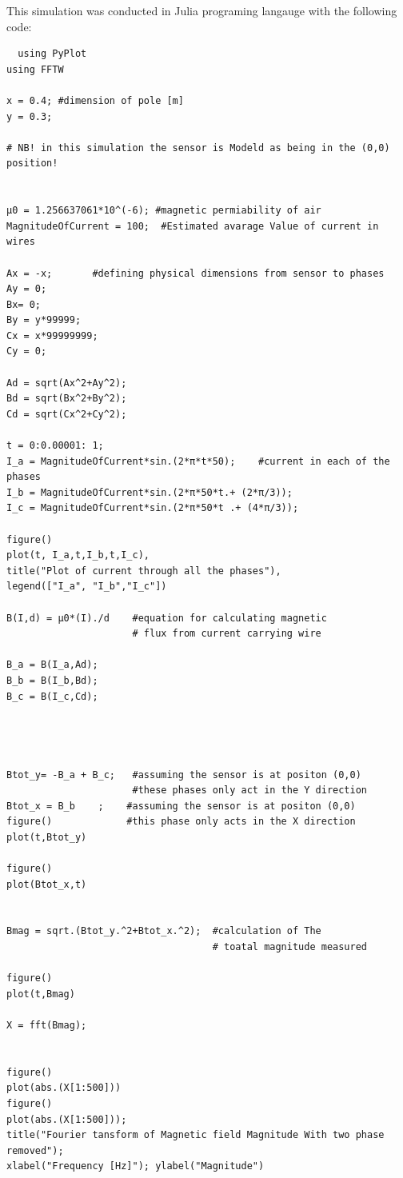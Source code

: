 \documentclass[12pt]{article}
\begin{document}
This simulation was conducted in Julia programing langauge with the following code:
\begin{verbatim}
  using PyPlot 
using FFTW

x = 0.4; #dimension of pole [m]
y = 0.3;

# NB! in this simulation the sensor is Modeld as being in the (0,0) position!


μ0 = 1.256637061*10^(-6); #magnetic permiability of air
MagnitudeOfCurrent = 100;  #Estimated avarage Value of current in wires

Ax = -x;       #defining physical dimensions from sensor to phases
Ay = 0;
Bx= 0;
By = y*99999;
Cx = x*99999999;
Cy = 0;

Ad = sqrt(Ax^2+Ay^2);
Bd = sqrt(Bx^2+By^2);
Cd = sqrt(Cx^2+Cy^2);

t = 0:0.00001: 1;
I_a = MagnitudeOfCurrent*sin.(2*π*t*50);    #current in each of the phases
I_b = MagnitudeOfCurrent*sin.(2*π*50*t.+ (2*π/3));
I_c = MagnitudeOfCurrent*sin.(2*π*50*t .+ (4*π/3));

figure()
plot(t, I_a,t,I_b,t,I_c),
title("Plot of current through all the phases"),
legend(["I_a", "I_b","I_c"])

B(I,d) = μ0*(I)./d    #equation for calculating magnetic
                      # flux from current carrying wire

B_a = B(I_a,Ad);
B_b = B(I_b,Bd);
B_c = B(I_c,Cd);




Btot_y= -B_a + B_c;   #assuming the sensor is at positon (0,0)
                      #these phases only act in the Y direction
Btot_x = B_b    ;    #assuming the sensor is at positon (0,0) 
figure()             #this phase only acts in the X direction
plot(t,Btot_y)

figure()
plot(Btot_x,t)


Bmag = sqrt.(Btot_y.^2+Btot_x.^2);  #calculation of The
                                    # toatal magnitude measured

figure()
plot(t,Bmag)

X = fft(Bmag);


figure()
plot(abs.(X[1:500]))
figure()
plot(abs.(X[1:500])); 
title("Fourier tansform of Magnetic field Magnitude With two phase removed"); 
xlabel("Frequency [Hz]"); ylabel("Magnitude")


\end{verbatim}
\end{document}
